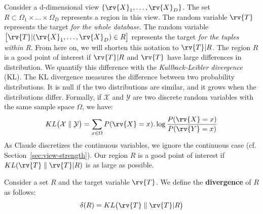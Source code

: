 Consider a d-dimensional view $\{\rv{X}_1, \ldots, \rv{X}_D\}$. The set
$R\subset \Omega_1 \times \ldots \times \Omega_D$ represents a region in this
view.  The random variable $\rv{T}$ represents the target \emph{for the whole
database}.  The random variable $\big[ \rv{T} | (\rv{X}_1, \ldots, \rv{X}_D) \in R
\big] $ represents the target \emph{for the tuples within R}. From here on, we
will shorten this notation to $\rv{T} | R$. The region $R$ is a good point
of interest if $\rv{T} |R $ and $\rv{T}$ have large differences in
distribution.  We quantify this difference with the \emph{Kullback-Leibler
divergence} (KL).  The KL divergence measures the difference between two
probability distributions. It is null if the two distributions are similar, and
it grows when the distributions differ.  Formally, if $\mathcal{X}$ and
$\mathcal{Y}$ are two discrete random variables with the same sample space
$\Omega$, we have:
\begin{equation}\label{eq:KL_disc} 
    KL\big( \mathcal{X} \parallel \mathcal{Y} \big) = 
    \sum_{x\in \Omega} P(\rv{X} = x).\log{\frac{P(\rv{X} = x)}{P(\rv{Y} = x)}} 
\end{equation}
As Claude discretizes the continuous variables, we ignore the continuous case
(cf.  Section~\ref{sec:view-strength}). Our region $R$ is a good point of
interest if $KL ( \rv{T} \parallel \rv{T} |R )$ is as large as possible.
\begin{definition}
    Consider a set $R$ and the target variable $\rv{T}$. We define the
    \textbf{divergence} of $R$ as follows: 
\begin{equation}\label{eq:divergence}
    \delta(R) = KL \big( \rv{T} \parallel \rv{T} |R \big)
\end{equation}
\end{definition}

